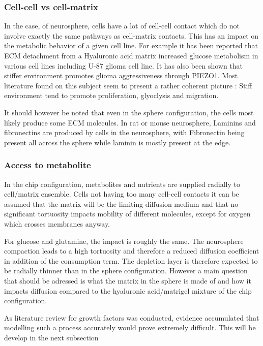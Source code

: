 \documentclass[11pt,a4paper]{article}
\begin{document}
\subsubsection{Cell-cell vs cell-matrix}
In the case, of neurosphere, cells have a lot of cell-cell contact which do not involve exactly the same pathways as cell-matrix contacts. This has an impact on the metabolic behavior of a given cell line. For example it has been reported that ECM detachment from a Hyaluronic acid matrix increased glucose metabolism in various cell lines including U-87 glioma cell line.\cite{Sullivan2018} It has also been shown that stiffer environment promotes glioma aggressiveness through PIEZO1.\cite{ChenX2018} Most literature found on this subject seem to present a rather coherent picture : Stiff environment tend to promote proliferation, glyoclysis and migration. \cite{Chen2021}\cite{Barnes2017}

It should however be noted that even in the sphere configuration, the cells most likely produce some ECM molecules. In rat or mouse neurosphere, Laminins and fibronectins are produced by cells in the neurosphere, with Fibronectin being present all across the sphere while laminin is mostly present at the edge.\cite{Campos2004}

\subsubsection{Access to metabolite}
In the chip configuration, metabolites and nutrients are supplied radially to cell/matrix ensemble. Cells not having too many cell-cell contacts it can be assumed that the matrix will be the limiting diffusion medium and that no significant tortuosity impacts mobility of different molecules, except for oxygen which crosses membranes anyway. 

For glucose and glutamine, the impact is roughly the same. The neurosphere compaction leads to a high tortuosity and therefore a reduced diffusion coefficient in addition of the consumption term. The depletion layer is therefore expected to be radially thinner than in the sphere configuration. However a main question that should be adressed is what the matrix in the sphere is made of and how it impacts diffusion compared to the hyaluronic acid/matrigel mixture of the chip configuration.

As literature review for growth factors was conducted, evidence accumulated that modelling such a process accurately would prove extremely difficult. This will be develop in the next subsection
\end{document}
